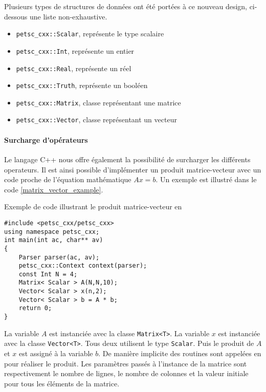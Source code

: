 Plusieurs types de structures de données ont été portées à ce nouveau design, ci-dessous une liste non-exhaustive.

\begin{itemize}
\item \verb#petsc_cxx::Scalar#, représente le type scalaire
\item \verb#petsc_cxx::Int#, représente un entier
\item \verb#petsc_cxx::Real#, représente un réel
\item \verb#petsc_cxx::Truth#, représente un booléen
\item \verb#petsc_cxx::Matrix#, classe représentant une matrice \petsc
\item \verb#petsc_cxx::Vector#, classe représentant un vecteur \petsc
\end{itemize}

\paragraph{Surcharge d'opérateurs}

Le langage C++ nous offre également la possibilité de surcharger les différents operateurs. Il est ainsi possible d'implémenter un produit matrice-vecteur avec un code proche de l'équation mathématique $Ax = b$. Un exemple est illustré dans le code \ref{matrix_vector_example}.

\begin{algorithm}[h]
  \caption{Exemple de code illustrant le produit matrice-vecteur en \petscx}
  \label{matrix_vector_example}
\begin{verbatim}
#include <petsc_cxx/petsc_cxx>
using namespace petsc_cxx;
int main(int ac, char** av)
{
    Parser parser(ac, av);
    petsc_cxx::Context context(parser);
    const Int N = 4;
    Matrix< Scalar > A(N,N,10);
    Vector< Scalar > x(n,2);
    Vector< Scalar > b = A * b;
    return 0;
}
\end{verbatim}
\end{algorithm}

La variable $A$ est instanciée avec la classe \verb#Matrix<T>#. La variable $x$ est instanciée avec la classe \verb#Vector<T>#. Tous deux utilisent le type \verb#Scalar#. Puis le produit de $A$ et $x$ est assigné à la variable $b$. De manière implicite des routines sont appelées en \petsc pour réaliser le produit. Les paramètres passés à l'instance de la matrice sont respectivement le nombre de lignes, le nombre de colonnes et la valeur initiale pour tous les éléments de la matrice.
